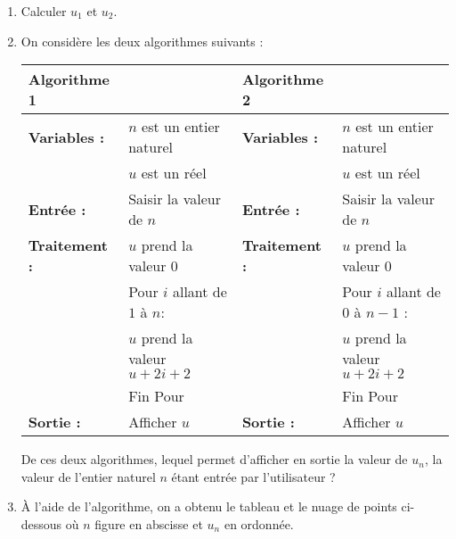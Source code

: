 \documentclass[10pt]{article}
\begin{document}
\begin{enumerate}
\item Calculer $u_{1}$ et $u_{2}$. 
\item On considère les deux algorithmes suivants : 

\medskip

\hspace*{-1cm}
{\footnotesize
\begin{tabularx}{1.1\linewidth}{|l X|l X|}\hline
\textbf{Algorithme 1}&	&\textbf{Algorithme 2}&\\ \hline
\textbf{Variables :}& 	$n$ est un entier naturel&\textbf{Variables :}& 	$n$ est un entier naturel\\  
&$u$ est un réel &	&$u$ est un réel \\
\textbf{Entrée :}&Saisir la valeur de $n$&\textbf{Entrée :}&Saisir la valeur de $n$\\
\textbf{Traitement :}& 	$u$ prend la valeur 0&\textbf{Traitement :}& 	$u$ prend la valeur $0$\\
 &Pour $i$ allant de $1$ à $n$: && Pour $i$ allant de $0$ à $n - 1$ :\\
&\hspace{0,2cm} $u$ prend la valeur $u + 2i + 2$&&\hspace{0,2cm} $u$ prend la valeur $u + 2i + 2$\\
& Fin Pour&	&Fin Pour\\
\textbf{Sortie :}& 	Afficher $u$&\textbf{Sortie :}& 	Afficher $u$\\ \hline
\end{tabularx}}
 
\medskip
 
De ces deux algorithmes, lequel permet d'afficher en sortie la valeur de $u_{n}$, la valeur de l'entier naturel $n$ étant entrée par l'utilisateur ? 
\item À l'aide de l'algorithme, on a obtenu le tableau et le nuage de points ci-dessous où $n$ figure en abscisse et $u_{n}$ en ordonnée. 

\medskip


\end{enumerate}
\end{document}
